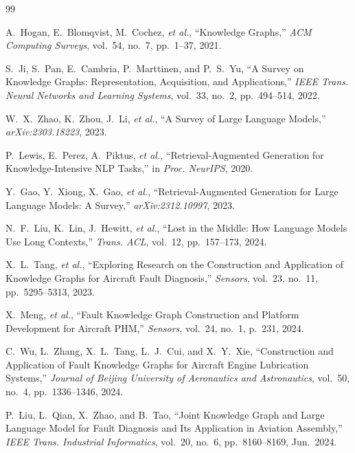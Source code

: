 \documentclass[12pt, a4paper]{article}
\begin{document}
\begin{thebibliography}{99}

A.~Hogan, E.~Blomqvist, M.~Cochez, \textit{et al.},
``Knowledge Graphs,''
\textit{ACM Computing Surveys}, vol.~54, no.~7, pp.~1--37, 2021.

S.~Ji, S.~Pan, E.~Cambria, P.~Marttinen, and P.~S.~Yu,
``A Survey on Knowledge Graphs: Representation, Acquisition, and Applications,''
\textit{IEEE Trans. Neural Networks and Learning Systems}, vol.~33, no.~2, pp.~494--514, 2022.

W.~X.~Zhao, K.~Zhou, J.~Li, \textit{et al.},
``A Survey of Large Language Models,''
\textit{arXiv:2303.18223}, 2023.

P.~Lewis, E.~Perez, A.~Piktus, \textit{et al.},
``Retrieval-Augmented Generation for Knowledge-Intensive NLP Tasks,''
in \textit{Proc. NeurIPS}, 2020.

Y.~Gao, Y.~Xiong, X.~Gao, \textit{et al.},
``Retrieval-Augmented Generation for Large Language Models: A Survey,''
\textit{arXiv:2312.10997}, 2023.

N.~F.~Liu, K.~Lin, J.~Hewitt, \textit{et al.},
``Lost in the Middle: How Language Models Use Long Contexts,''
\textit{Trans. ACL}, vol.~12, pp.~157--173, 2024.

X.~L.~Tang, \textit{et al.},
``Exploring Research on the Construction and Application of Knowledge Graphs for Aircraft Fault Diagnosis,''
\textit{Sensors}, vol.~23, no.~11, pp.~5295--5313, 2023.

X.~Meng, \textit{et al.},
``Fault Knowledge Graph Construction and Platform Development for Aircraft PHM,''
\textit{Sensors}, vol.~24, no.~1, p.~231, 2024.

C.~Wu, L.~Zhang, X.~L.~Tang, L.~J.~Cui, and X.~Y.~Xie,
``Construction and Application of Fault Knowledge Graphs for Aircraft Engine Lubrication Systems,''
\textit{Journal of Beijing University of Aeronautics and Astronautics}, vol.~50, no.~4, pp.~1336--1346, 2024.

P.~Liu, L.~Qian, X.~Zhao, and B.~Tao,
``Joint Knowledge Graph and Large Language Model for Fault Diagnosis and Its Application in Aviation Assembly,''
\textit{IEEE Trans. Industrial Informatics}, vol.~20, no.~6, pp.~8160--8169, Jun.~2024.


\end{thebibliography}
\end{document}
